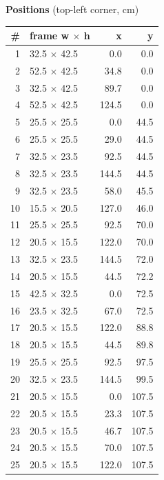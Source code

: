 \documentclass[a4paper,landscape,10pt]{article}
\begin{document}
\begin{minipage}[t]{0.25\textwidth}
\vspace{8pt}
{\bfseries Positions} (top-left corner, cm)\\[2pt]
\tiny
\begin{tabular}{@{}r l r r@{}}
\toprule
\# & frame w $\times$ h & x & y \\
\midrule
1 & 32.5 $\times$ 42.5 & 0.0 & 0.0 \\
2 & 52.5 $\times$ 42.5 & 34.8 & 0.0 \\
3 & 32.5 $\times$ 42.5 & 89.7 & 0.0 \\
4 & 52.5 $\times$ 42.5 & 124.5 & 0.0 \\
5 & 25.5 $\times$ 25.5 & 0.0 & 44.5 \\
6 & 25.5 $\times$ 25.5 & 29.0 & 44.5 \\
7 & 32.5 $\times$ 23.5 & 92.5 & 44.5 \\
8 & 32.5 $\times$ 23.5 & 144.5 & 44.5 \\
9 & 32.5 $\times$ 23.5 & 58.0 & 45.5 \\
10 & 15.5 $\times$ 20.5 & 127.0 & 46.0 \\
11 & 25.5 $\times$ 25.5 & 92.5 & 70.0 \\
12 & 20.5 $\times$ 15.5 & 122.0 & 70.0 \\
13 & 32.5 $\times$ 23.5 & 144.5 & 72.0 \\
14 & 20.5 $\times$ 15.5 & 44.5 & 72.2 \\
15 & 42.5 $\times$ 32.5 & 0.0 & 72.5 \\
16 & 23.5 $\times$ 32.5 & 67.0 & 72.5 \\
17 & 20.5 $\times$ 15.5 & 122.0 & 88.8 \\
18 & 20.5 $\times$ 15.5 & 44.5 & 89.8 \\
19 & 25.5 $\times$ 25.5 & 92.5 & 97.5 \\
20 & 32.5 $\times$ 23.5 & 144.5 & 99.5 \\
21 & 20.5 $\times$ 15.5 & 0.0 & 107.5 \\
22 & 20.5 $\times$ 15.5 & 23.3 & 107.5 \\
23 & 20.5 $\times$ 15.5 & 46.7 & 107.5 \\
24 & 20.5 $\times$ 15.5 & 70.0 & 107.5 \\
25 & 20.5 $\times$ 15.5 & 122.0 & 107.5 \\
\bottomrule
\end{tabular}
\end{minipage}
\clearpage
\end{document}
